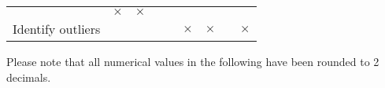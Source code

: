 \documentclass[]{report}
\begin{document}
\begin{longtable}[]{@{}lcccccccc@{}}
\begin{minipage}[t]{0.06\columnwidth}
\end{minipage} & \begin{minipage}[t]{0.06\columnwidth}\centering
\(\times\)\strut
\end{minipage} & \begin{minipage}[t]{0.09\columnwidth}\centering
\(\times\)\strut
\end{minipage} & \begin{minipage}[t]{0.06\columnwidth}\centering
\strut
\end{minipage} & \begin{minipage}[t]{0.06\columnwidth}\centering
\strut
\end{minipage} & \begin{minipage}[t]{0.05\columnwidth}\centering
\strut
\end{minipage} & \begin{minipage}[t]{0.06\columnwidth}\centering
\strut
\end{minipage}\tabularnewline
\begin{minipage}[t]{0.28\columnwidth}\raggedright
Identify outliers\strut
\end{minipage} & \begin{minipage}[t]{0.06\columnwidth}\centering
\strut
\end{minipage} & \begin{minipage}[t]{0.06\columnwidth}\centering
\strut
\end{minipage} & \begin{minipage}[t]{0.06\columnwidth}\centering
\strut
\end{minipage} & \begin{minipage}[t]{0.09\columnwidth}\centering
\strut
\end{minipage} & \begin{minipage}[t]{0.06\columnwidth}\centering
\(\times\)\strut
\end{minipage} & \begin{minipage}[t]{0.06\columnwidth}\centering
\(\times\)\strut
\end{minipage} & \begin{minipage}[t]{0.05\columnwidth}\centering
\strut
\end{minipage} & \begin{minipage}[t]{0.06\columnwidth}\centering
\(\times\)\strut
\end{minipage}\tabularnewline
\bottomrule
\end{longtable}

Please note that all numerical values in the following have been rounded
to 2 decimals.
\end{document}
